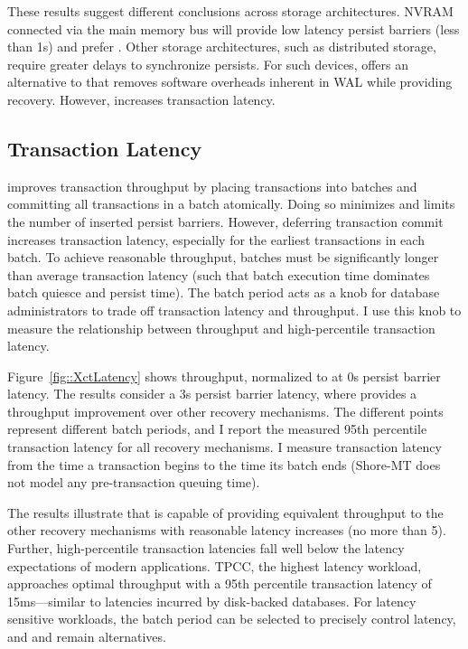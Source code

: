 These results suggest different conclusions across storage architectures.
NVRAM connected via the main memory bus will provide low latency persist barriers (less than 1\textmu s) and prefer \InPlace.
Other storage architectures, such as distributed storage, require greater delays to synchronize persists.
For such devices, \GroupCommit offers an alternative to \NVDisk that removes software overheads inherent in WAL while providing recovery.
However, \GroupCommit increases transaction latency.

\subsection{Transaction Latency}
\label{sec:OLTP_eval:Persists:XctLatency}



\GroupCommit improves transaction throughput by placing transactions into batches and committing all transactions in a batch atomically.
Doing so minimizes and limits the number of inserted persist barriers.
However, deferring transaction commit increases transaction latency, especially for the earliest transactions in each batch.
To achieve reasonable throughput, batches must be significantly longer than average transaction latency (such that batch execution time dominates batch quiesce and persist time).
The batch period acts as a knob for database administrators to trade off transaction latency and throughput.
I use this knob to measure the relationship between throughput and high-percentile transaction latency.

Figure~\ref{fig::XctLatency} shows throughput, normalized to \InPlace at 0\textmu s persist barrier latency.
The results consider a 3\textmu s persist barrier latency, where \GroupCommit provides a throughput improvement over other recovery mechanisms.
The different \GroupCommit points represent different batch periods, and I report the measured 95th percentile transaction latency for all recovery mechanisms.
I measure transaction latency from the time a transaction begins to the time its batch ends (Shore-MT does not model any pre-transaction queuing time).

The results illustrate that \GroupCommit is capable of providing equivalent throughput to the other recovery mechanisms with reasonable latency increases (no more than 5\texttimes).
Further, high-percentile transaction latencies fall well below the latency expectations of modern applications.
TPCC, the highest latency workload, approaches optimal throughput with a 95th percentile transaction latency of 15ms---similar to latencies incurred by disk-backed databases.
For latency sensitive workloads, the batch period can be selected to precisely control latency, and \InPlace and \NVDisk remain alternatives.

